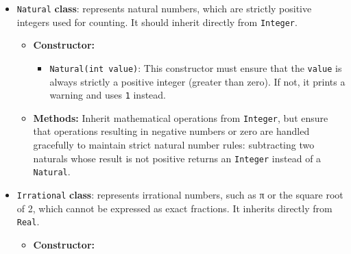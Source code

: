 \begin{enumerate}
\begin{itemize}
\begin{itemize}
\begin{itemize}
                        \end{itemize}

                    \item \textbf{Methods:} Override the mathematical operation methods if necessary to ensure the results maintain integer-specific behaviors when operating with other integers.

                \end{itemize}

            \item \texttt{Natural} \textbf{class}: represents natural numbers, which are strictly positive integers used for counting. It should inherit directly from \texttt{Integer}.

                \begin{itemize}

                    \item \textbf{Constructor:}

                        \begin{itemize}

                            \item \texttt{Natural(int value)}: This constructor must ensure that the \texttt{value} is always strictly a positive integer (greater than zero). If not, it prints a warning and uses \texttt{1} instead.

                        \end{itemize}

                    \item \textbf{Methods:} Inherit mathematical operations from \texttt{Integer}, but ensure that operations resulting in negative numbers or zero are handled gracefully to maintain strict natural number rules: subtracting two naturals whose result is not positive returns an \texttt{Integer} instead of a \texttt{Natural}.

                \end{itemize}

            \item \texttt{Irrational} \textbf{class}: represents irrational numbers, such as π or the square root of 2, which cannot be expressed as exact fractions. It inherits directly from \texttt{Real}.

                \begin{itemize}

                    \item \textbf{Constructor:}


\end{itemize}
\end{itemize}
\end{enumerate}
